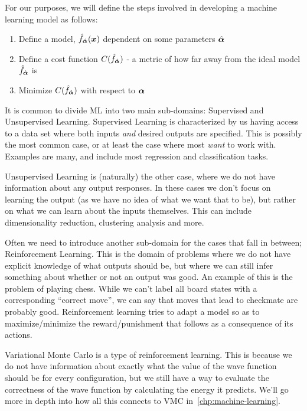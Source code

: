 \documentclass[Thesis.tex]{subfiles}
\begin{document}
For our purposes, we will define the steps involved in developing a machine
learning model as follows:

\begin{enumerate}
  \item Define a model, $\hat f_{\hat{\bm{\alpha}}}(\bm{x})$ dependent on some parameters $\hat{\bm{\alpha}}$
  \item Define a cost function $C(\hat f_{\hat{\bm{\alpha}}})$ - a metric of how far away from the
      ideal model $\hat f_{\hat{\bm{\alpha}}}$ is
  \item Minimize $C(\hat f_{\hat{\bm{\alpha}}})$ with respect to $\bm{\alpha}$
\end{enumerate}

It is common to divide ML into two main sub-domains: Supervised and Unsupervised
Learning. Supervised Learning is characterized by us having access to a data set
where both inputs \emph{and} desired outputs are specified. This is possibly the
most common case, or at least the case where most \emph{want} to work with.
Examples are many, and include most regression and classification tasks.

Unsupervised Learning is (naturally) the other case, where we do not have
information about any output responses. In these cases we don't focus on
learning the output (as we have no idea of what we want that to be), but rather
on what we can learn about the inputs themselves. This can include
dimensionality reduction, clustering analysis and more.

Often we need to introduce another sub-domain for the cases that fall in
between; Reinforcement Learning. This is the domain of problems where we do not
have explicit knowledge of what outputs should be, but where we can still infer
something about whether or not an output was good. An example of this is the
problem of playing chess. While we can't label all board states with a
corresponding ``correct move'', we can say that moves that lead to
checkmate are probably good. Reinforcement learning tries to adapt a model so as
to maximize/minimize the reward/punishment that follows as a consequence of its
actions.

Variational Monte Carlo is a type of reinforcement learning. This is because we
do not have information about exactly what the value of the wave function should
be for every configuration, but we still have a way to evaluate the correctness
of the wave function by calculating the energy it predicts. We'll go more in
depth into how all this connects to VMC in~\cref{chp:machine-learning}.
\end{document}
